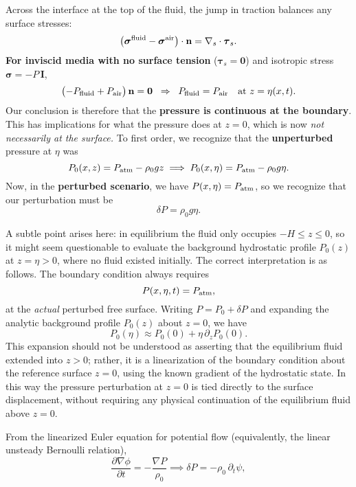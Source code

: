 Across the interface at the top of the fluid, the jump in traction balances any surface stresses:
\begin{equation}
\bigl(\boldsymbol{\sigma}^{\rm fluid}-\boldsymbol{\sigma}^{\rm air}\bigr)\cdot{\bf n}
= \nabla_s\cdot\boldsymbol{\tau}_s.
\end{equation}
 \textbf{For inviscid media with no surface tension} ($\boldsymbol{\tau}_s=\mathbf{0}$) and isotropic stress $\boldsymbol{\sigma}=-P\,\mathbf{I}$,
\begin{equation}
\bigl(-P_{\rm fluid}+P_{\rm air}\bigr)\,{\bf n}=\mathbf{0}
\;\;\Rightarrow\;\;
P_{\rm fluid}=P_{\rm air}
\quad \text{at } z=\eta(x,t).
\end{equation}
Our conclusion is therefore that the \textbf{pressure is continuous at the boundary}. This has implications for what the pressure does at $z=0$, which is now \textit{not necessarily at the surface.} To first order, we recognize that the \textbf{unperturbed} pressure at $\eta$ was
\[
P_0(x,z) = P_{\rm atm} - \rho_0 g z \implies P_0(x,\eta) = P_{\rm atm}-\rho_0 g \eta.
\]
Now, in the \textbf{perturbed scenario}, we have $P(x,\eta) = P_{\rm atm}$, so we recognize that our perturbation must be
\[
\delta P = \rho_0 g\eta.
\]
\begin{remark}
A subtle point arises here: in equilibrium the fluid only occupies $-H \leq z \leq 0$, so it might seem questionable to evaluate the background hydrostatic profile $P_0(z)$ at $z=\eta>0$, where no fluid existed initially. The correct interpretation is as follows. The boundary condition always requires
\[
P(x,\eta,t) = P_{\rm atm},
\]
at the \emph{actual} perturbed free surface. Writing $P = P_0 + \delta P$ and expanding the analytic background profile $P_0(z)$ about $z=0$, we have
\[
P_0(\eta) \approx P_0(0) + \eta \,\partial_z P_0(0).
\]
This expansion should not be understood as asserting that the equilibrium fluid extended into $z>0$; rather, it is a linearization of the boundary condition about the reference surface $z=0$, using the known gradient of the hydrostatic state. In this way the pressure perturbation at $z=0$ is tied directly to the surface displacement, without requiring any physical continuation of the equilibrium fluid above $z=0$.
\end{remark}
From the linearized Euler equation for potential flow (equivalently, the linear unsteady Bernoulli relation),
\begin{equation}
\frac{\partial \nabla \phi}{\partial t} = - \frac{\nabla P}{\rho_0} \implies \delta P = -\rho_0\,\partial_t \psi,
\end{equation}
